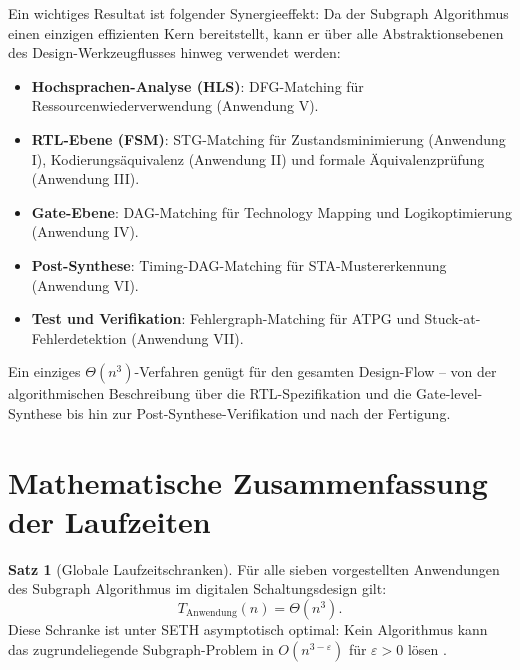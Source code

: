﻿\documentclass[a4paper,12pt]{article}
\theoremstyle{definition}
\newtheorem{satz}{Satz}
\begin{document}
Ein wichtiges Resultat ist folgender Synergieeffekt: Da der Subgraph Algorithmus einen
einzigen effizienten Kern bereitstellt, kann er über alle Abstraktionsebenen des
Design-Werkzeugflusses hinweg verwendet werden:

\begin{itemize}
  \item \textbf{Hochsprachen-Analyse (HLS)}: DFG-Matching für Ressourcenwiederverwendung
        (Anwendung V).
  \item \textbf{RTL-Ebene (FSM)}: STG-Matching für Zustandsminimierung
        (Anwendung I), Kodierungsäquivalenz (Anwendung II) und formale
        Äquivalenzprüfung (Anwendung III).
  \item \textbf{Gate-Ebene}: DAG-Matching für Technology Mapping und Logikoptimierung
        (Anwendung IV).
  \item \textbf{Post-Synthese}: Timing-DAG-Matching für STA-Mustererkennung
        (Anwendung VI).
  \item \textbf{Test und Verifikation}: Fehlergraph-Matching für ATPG und
        Stuck-at-Fehlerdetek\-tion (Anwendung VII).
\end{itemize}

Ein einziges $\Theta(n^3)$-Verfahren genügt für den gesamten Design-Flow --
von der algorithmischen Beschreibung über die RTL-Spezifikation und die
Gate-level-Synthese bis hin zur Post-Synthese-Verifikation und
nach der Fertigung.

\section{Mathematische Zusammenfassung der Laufzeiten}

\begin{satz}[Globale Laufzeitschranken]\label{satz:global}
  Für alle sieben vorgestellten Anwendungen des Subgraph Algorithmus im digitalen
  Schaltungsdesign gilt:
  \[
    T_{\text{Anwendung}}(n) = \Theta(n^3).
  \]
  Diese Schranke ist unter SETH asymptotisch optimal: Kein Algorithmus kann das
  zugrundeliegende Subgraph-Problem in $O(n^{3-\varepsilon})$ für $\varepsilon > 0$ lösen
  \cite{subgraph2026,abboud2015tight}.
\end{satz}
\end{document}
